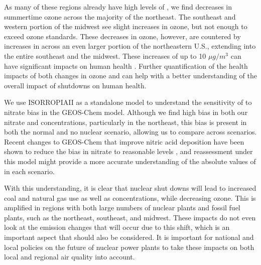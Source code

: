 \documentclass[12]{article}
\begin{document}
As many of these regions already have high levels of , we find decreases in summertime ozone across the majority of the northeast. The southeast and western portion of the midwest see slight increases in ozone, but not enough to exceed ozone standards. These decreases in ozone, however, are countered by increases in  across an even larger portion of the northeastern U.S., extending into the entire southeast and the midwest. These increases of up to 10 $\mu g/m^3$ can have significant impacts on human health \citep{burnett_global_2018}. Further quantification of the health impacts of both changes in ozone and  can help with a better understanding of the overall impact of shutdowns on human health. 

We use ISORROPIAII as a standalone model to understand the sensitivity of  to nitrate bias in the GEOS-Chem model. Although we find high bias in both our nitrate and  concentrations, particularly in the northeast, this bias is present in both the normal and no nuclear scenario, allowing us to compare across scenarios. Recent changes to GEOS-Chem that improve nitric acid deposition have been shown to reduce the bias in nitrate to reasonable levels \citep{luo_revised_2019}, and reassessment under this model might provide a more accurate understanding of the absolute values of  in each scenario.

With this understanding, it is clear that nuclear shut downs will lead to increased coal and natural gas use as well as  concentrations, while decreasing ozone. This is amplified in regions with both large numbers of nuclear plants and fossil fuel plants, such as the northeast, southeast, and midwest. These impacts do not even look at the  emission changes that will occur due to this shift, which is an important aspect that should also be considered. It is important for national and local policies on the future of nuclear power plants to take these impacts on both local and regional air quality into account.


\pagebreak


\end{document}

